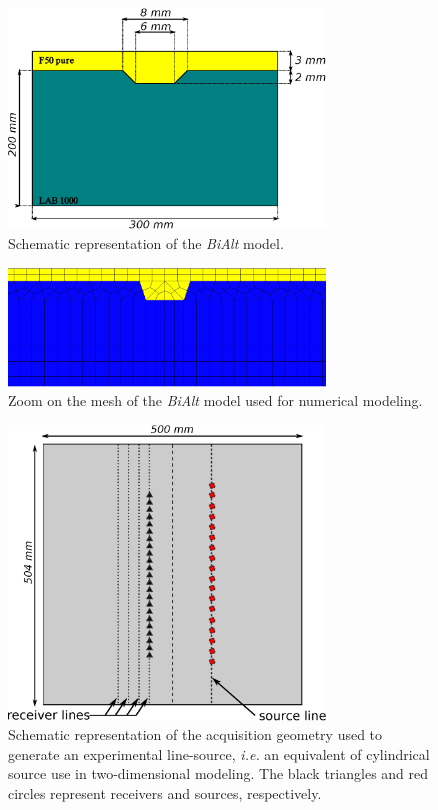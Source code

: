 \documentclass[manuscript,revised]{geophysics}
\newcommand{\bialt}{\textit{BiAlt} }
\begin{document}
\begin{figure}[!h]
\centering
\includegraphics[width=0.75\textwidth]{fig/bialt_model.eps}
\caption{Schematic representation of the \bialt model.}
\label{panel_bialt_model}
\end{figure}

\begin{figure}[!h]
\centering
\includegraphics[width=0.75\textwidth]{fig/bialt-mesh.eps}
\caption{Zoom on the mesh of the \bialt model used for numerical modeling.}
\label{panel_bialt_mesh}
\end{figure}

\begin{figure}[!h]
\centering
\includegraphics[width=0.75\textwidth]{fig/amplitude_acqui_principle.eps}
\caption{Schematic representation of the acquisition geometry used to generate an experimental line-source, \textit{i.e.} an equivalent of cylindrical source use in two-dimensional modeling. The black triangles and red circles represent receivers and sources, respectively.}
\label{amplitude_acqui_principle}
\end{figure}
\end{document}
